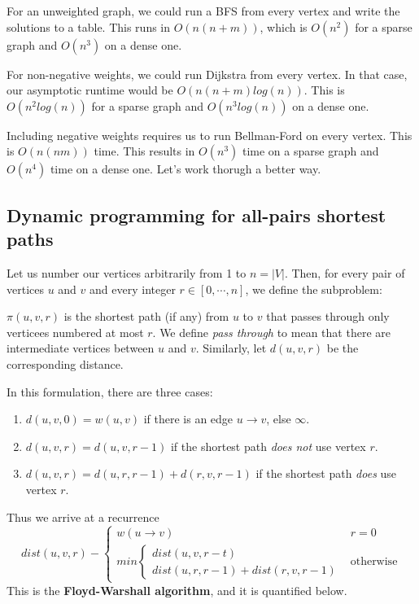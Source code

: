\documentclass[titlepage, 12pt, leqno]{article}
\begin{document}
For an unweighted graph, we could run a BFS from every vertex and write the
solutions to a table. This runs in $O(n(n+m))$, which is $O(n^{2})$ for a 
sparse graph and $O(n^{3})$ on a dense one.

For non-negative weights, we could run Dijkstra from every vertex. In that 
case, our asymptotic runtime would be $O(n(n+m)log(n))$. This is $O(n^{2}log(n))$
for a sparse graph and $O(n^{3}log(n))$ on a dense one.

Including negative weights requires us to run Bellman-Ford on every vertex. This
is $O(n(nm))$ time. This results in $O(n^{3})$ time on a sparse graph and
$O(n^{4})$ time on a dense one. Let's work thorugh a better way.

\subsection{Dynamic programming for all-pairs shortest paths}
Let us number our vertices arbitrarily from 1 to $n = |V|$. Then, for every pair
of vertices $u$ and $v$ and every integer $r \in [0, \cdots ,n]$, we define
the subproblem:

$\pi(u,v,r)$ is the shortest path (if any) from $u$ to $v$ that passes through
only verticees numbered at most $r$. We define \textit{pass through} to mean
that there are intermediate vertices between $u$ and $v$. Similarly, let
$d(u,v,r)$ be the corresponding distance.

In this formulation, there are three cases:
\begin{enumerate}
    \item $d(u,v,0) = w(u,v)$ if there is an edge $u \rightarrow v$, else
        $\infty$.
    \item $d(u,v,r) = d(u,v,r-1)$ if the shortest path \textit{does not} use
        vertex $r$.
    \item $d(u,v,r) = d(u,r,r-1) + d(r,v,r-1)$ if the shortest path \textit{does}
        use vertex $r$.
\end{enumerate}
Thus we arrive at a recurrence
\[
dist(u,v,r) -
\begin{cases}
    w(u \rightarrow v) & r=0 \\
    min
       \begin{cases}
           dist(u,v,r-t) \\
           dist(u,r,r-1) + dist(r,v,r-1)
       \end{cases}
       & \text{otherwise}
\end{cases}
\]
This is the \textbf{Floyd-Warshall algorithm}, and it is quantified below.
\end{document}
